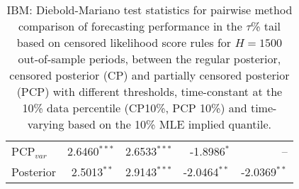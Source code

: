 {\begin{table}
\begin{tabular}{l | rrrr}
PCP$_{var}$ & 2.6460$^{***}$ & 2.6533$^{***}$ & -1.8986$^{*}$\phantom{$^{**}$} &    --\phantom{$^{***}$}   \\ 
Posterior & 2.5013$^{**}$\phantom{$^{*}$} & 2.9143$^{***}$ & -2.0464$^{**}$\phantom{$^{*}$} & -2.0369$^{**}$\phantom{$^{*}$}   \\ 
\hline 
\end{tabular}
 \caption{IBM: Diebold-Mariano test statistics for  pairwise method comparison of forecasting performance in the $\tau$\% tail based on  censored likelihood score rules   for $H=1500$ out-of-sample periods,  between  the regular posterior, censored posterior (CP) and partially censored posterior (PCP) with different thresholds,  time-constant at the 10\% data percentile (CP10\%, PCP 10\%) and time-varying based on the 10\% MLE implied quantile. }
\label{tab:IBM_DM}  
\end{table}
}